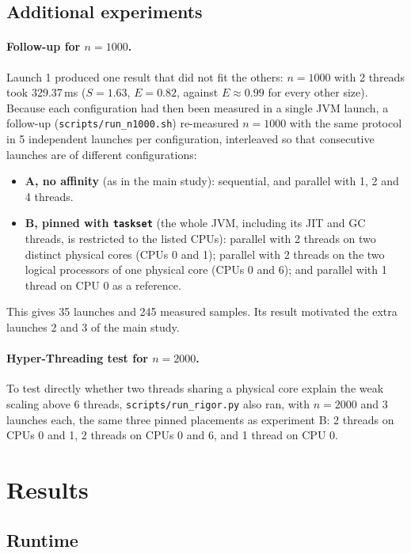 \documentclass[11pt,a4paper]{article}
\newcommand{\code}[1]{\texttt{#1}}
\begin{document}
\subsection{Additional experiments}\label{sec:followup-method}

\paragraph{Follow-up for $n = 1000$.} Launch 1 produced one result that did not fit the others: $n = 1000$ with 2 threads took 329.37\,ms ($S = 1.63$, $E = 0.82$, against $E \approx 0.99$ for every other size). Because each configuration had then been measured in a single JVM launch, a follow-up (\code{scripts/run\_n1000.sh}) re-measured $n = 1000$ with the same protocol in 5 independent launches per configuration, interleaved so that consecutive launches are of different configurations:
\begin{itemize}
  \item \textbf{A, no affinity} (as in the main study): sequential, and parallel with 1, 2 and 4 threads.
  \item \textbf{B, pinned with \code{taskset}} (the whole JVM, including its JIT and GC threads, is restricted to the listed CPUs): parallel with 2 threads on two distinct physical cores (CPUs 0 and 1); parallel with 2 threads on the two logical processors of one physical core (CPUs 0 and 6); and parallel with 1 thread on CPU 0 as a reference.
\end{itemize}
This gives 35 launches and 245 measured samples. Its result motivated the extra launches 2 and 3 of the main study.

\paragraph{Hyper-Threading test for $n = 2000$.} To test directly whether two threads sharing a physical core explain the weak scaling above 6 threads, \code{scripts/run\_rigor.py} also ran, with $n = 2000$ and 3 launches each, the same three pinned placements as experiment B: 2 threads on CPUs 0 and 1, 2 threads on CPUs 0 and 6, and 1 thread on CPU 0.

\section{Results}

\subsection{Runtime}
\end{document}
